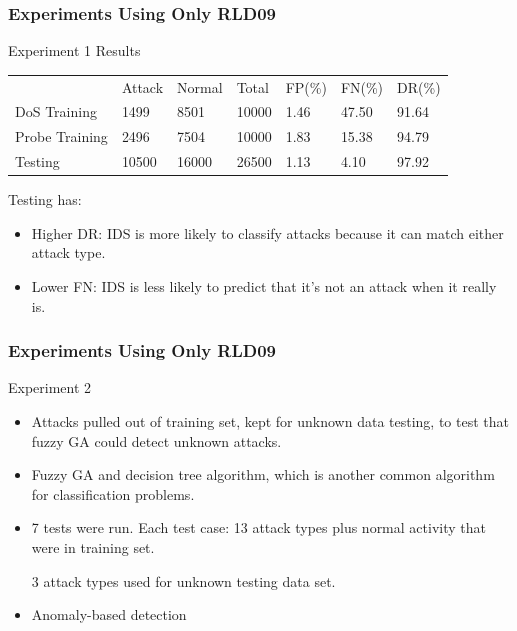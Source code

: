 \documentclass{beamer}
\newcommand{\linespace}{\vskip 0.25cm}
\begin{document}
\begin{frame}
	\frametitle{Experiments Using Only RLD09}
	Experiment 1 Results
\begin{table}
\begin{small}
\begin{tabular}{lllllll}
 & Attack & Normal & Total & FP(\%) & FN(\%) & DR(\%)\\
DoS Training & 1499 & 8501 & 10000 & 1.46 & 47.50 & 91.64\\
Probe Training & 2496 & 7504 & 10000 & 1.83 & 15.38 & 94.79\\
Testing & 10500 & 16000 & 26500 & 1.13 & 4.10 & 97.92\\
\end{tabular}
\end{small}
\end{table}

\linespace
Testing has:
\begin{itemize}
	\item Higher DR: IDS is more likely to classify attacks because it can match either attack type.
	\item Lower FN: IDS is less likely to predict that it's not an attack when it really is.
\end{itemize}
\end{frame}


\begin{frame}
	\frametitle{Experiments Using Only RLD09}
Experiment 2
	\begin{itemize}
		\item Attacks pulled out of training set, kept for unknown data testing, to test that fuzzy GA could detect unknown attacks.
		\item Fuzzy GA and decision tree algorithm, which is another common algorithm for classification problems.
		\item 7 tests were run. Each test case: 13 attack types plus normal activity that were in training set. 
		
		3 attack types used for unknown testing data set.
		\item Anomaly-based detection
	\end{itemize}
\end{frame}
\end{document}
